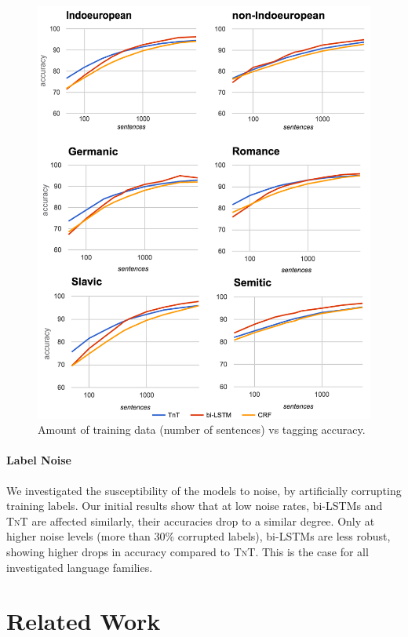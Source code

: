 \documentclass[11pt]{article}
\begin{document}
\begin{figure}
\includegraphics[width=1.0\columnwidth]{learningcurves.png}
\caption{Amount of training data (number of sentences) vs tagging accuracy. }
\label{fig:curve}
\end{figure}

\paragraph{Label Noise} We investigated the susceptibility of the models to noise, by artificially corrupting training labels. 
Our initial results show that at low noise rates, bi-LSTMs and \textsc{TnT} are affected similarly, their accuracies drop to a similar degree. Only at higher noise levels (more than 30\% corrupted labels), bi-LSTMs are less robust, showing higher drops in accuracy compared to \textsc{TnT}. This is the case for all investigated language families. %
\section{Related Work}
\end{document}
